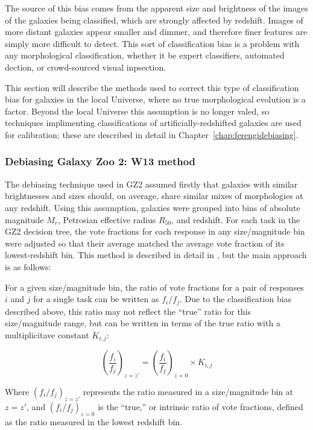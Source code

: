 The source of this bias comes from the apparent size and brightness of the images of the galaxies being classified, which are strongly affected by redshift. Images of more distant galaxies appear smaller and dimmer, and therefore finer features are simply more difficult to detect. This sort of classification bias is a problem with any morphological classification, whether it be expert classifiers, automated dection, or crowd-sourced visual inpsection.

This section will describe the methods used to correct this type of classification bias for galaxies in the local Universe, where no true morphological evolution is a factor. Beyond the local Universe this assumption is no longer valed, so techniques implimenting classifications of artificially-redshifted galaxies are used for calibration; these are described in detail in Chapter~\ref{chap:ferengidebiasing}. 

\subsubsection{Debiasing Galaxy Zoo 2: W13 method}

The debiasing technique used in GZ2 assumed firstly that galaxies with similar brightnesses and sizes should, on average, share similar mixes of morphologies at any redshift. Using this assumption, galaxies were grouped into bins of absolute magnitude $M_r$, Petrosian effective radius $R_{50}$, and redshift. For each task in the GZ2 decision tree, the vote fractions for each response in any size/magnitude bin were adjusted so that their average matched the average vote fraction of its lowest-redshift bin. This method is described in detail in \citet{Willett2013}, but the main approach is as follows:

For a given size/magnitude bin, the ratio of vote fractions for a pair of responses $i$ and $j$ for a single task can be written as $f_i/f_j$. Due to the classification bias described above, this ratio may not reflect the ``true'' ratio for this size/magnitude range, but can be written in terms of the true ratio with a multiplicitave constant $K_{i,j}$:

\begin{equation}
\left(\frac{f_i}{f_j}\right)_{z=z'} = \left(\frac{f_i}{f_j}\right)_{z=0} \times K_{i,j}
\label{eqn:fvspk}
\end{equation}

Where $(f_i/f_j)_{z=z'}$ represents the ratio measured in a size/magnitude bin at $z=z'$, and $(f_i/f_j)_{z=0}$ is the ``true,'' or intrinsic ratio of vote fractions, defined as the ratio measured in the lowest redshift bin.


